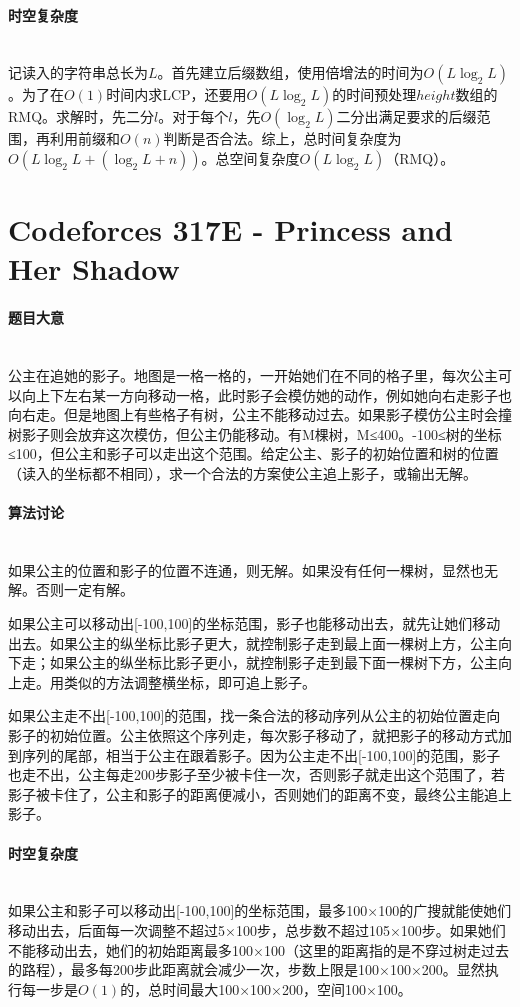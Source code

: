 \documentclass[UTF8]{ctexart}
\newcommand{\myparagraph}[1]{\paragraph{#1}\mbox{}\\}
\theoremstyle{nonumberplain}
\begin{document}
		\myparagraph{时空复杂度}
		
			记读入的字符串总长为$L$。首先建立后缀数组，使用倍增法的时间为$O(L\log_2L)$。为了在$O(1)$时间内求LCP，还要用$O(L\log_2L)$的时间预处理$height$数组的RMQ。求解时，先二分$l$。对于每个$l$，先$O(\log_2L)$二分出满足要求的后缀范围，再利用前缀和$O(n)$判断是否合法。综上，总时间复杂度为$O(L\log_2L+(\log_2L+n))$。总空间复杂度$O(L\log_2L)$（RMQ）。
	
	\section{Codeforces 317E - Princess and Her Shadow}
	
		\myparagraph{题目大意}
		
			公主在追她的影子。地图是一格一格的，一开始她们在不同的格子里，每次公主可以向上下左右某一方向移动一格，此时影子会模仿她的动作，例如她向右走影子也向右走。但是地图上有些格子有树，公主不能移动过去。如果影子模仿公主时会撞树影子则会放弃这次模仿，但公主仍能移动。有M棵树，M≤400。-100≤树的坐标≤100，但公主和影子可以走出这个范围。给定公主、影子的初始位置和树的位置（读入的坐标都不相同），求一个合法的方案使公主追上影子，或输出无解。
		
		\myparagraph{算法讨论}
			
			如果公主的位置和影子的位置不连通，则无解。如果没有任何一棵树，显然也无解。否则一定有解。
			
			如果公主可以移动出[-100,100]的坐标范围，影子也能移动出去，就先让她们移动出去。如果公主的纵坐标比影子更大，就控制影子走到最上面一棵树上方，公主向下走；如果公主的纵坐标比影子更小，就控制影子走到最下面一棵树下方，公主向上走。用类似的方法调整横坐标，即可追上影子。
			
			如果公主走不出[-100,100]的范围，找一条合法的移动序列从公主的初始位置走向影子的初始位置。公主依照这个序列走，每次影子移动了，就把影子的移动方式加到序列的尾部，相当于公主在跟着影子。因为公主走不出[-100,100]的范围，影子也走不出，公主每走200步影子至少被卡住一次，否则影子就走出这个范围了，若影子被卡住了，公主和影子的距离便减小，否则她们的距离不变，最终公主能追上影子。
			
		\myparagraph{时空复杂度}
			
			如果公主和影子可以移动出[-100,100]的坐标范围，最多100×100的广搜就能使她们移动出去，后面每一次调整不超过5×100步，总步数不超过105×100步。如果她们不能移动出去，她们的初始距离最多100×100（这里的距离指的是不穿过树走过去的路程），最多每200步此距离就会减少一次，步数上限是100×100×200。显然执行每一步是$O(1)$的，总时间最大100×100×200，空间100×100。
	
\end{document}
